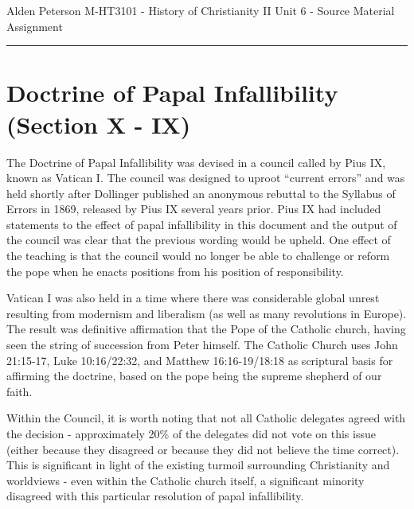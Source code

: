 \documentclass[12pt]{turabian-researchpaper}
\begin{document}
\begin{singlespace}
\noindent Alden Peterson \newline
\noindent M-HT3101 - History of Christianity II\newline
\noindent Unit 6 - Source Material Assignment
\newline\noindent\rule{4cm}{0.4pt}
\end{singlespace}




\section{Doctrine of Papal Infallibility (Section X - IX)}

The Doctrine of Papal Infallibility was devised in a council called by Pius IX, known as Vatican I.\autocite[pg.626]{woodbridge2013}  The council was designed to uproot “current errors” and was held shortly after Dollinger published an anonymous rebuttal to the Syllabus of Errors in 1869, released by Pius IX several years prior.\autocite[pg.626]{woodbridge2013}  Pius IX had included statements to the effect of papal infallibility in this document and the output of the council was clear that the previous wording would be upheld.\autocite[pg.626]{woodbridge2013}  One effect of the teaching is that the council would no longer be able to challenge or reform the pope when he enacts positions from his position of responsibility.\autocite[pg.626]{woodbridge2013} 

Vatican I was also held in a time where there was considerable global unrest resulting from modernism and liberalism (as well as many revolutions in Europe). The result was definitive affirmation that the Pope of the Catholic church, having seen the string of succession from Peter himself. The Catholic Church uses John 21:15-17, Luke 10:16/22:32, and Matthew 16:16-19/18:18 as scriptural basis for affirming the doctrine, based on the pope being the supreme shepherd of our faith.\autocite{papalinfallibility}

Within the Council, it is worth noting that not all Catholic delegates agreed with the decision - approximately 20\% of the delegates did not vote on this issue (either because they disagreed or because they did not believe the time correct).\autocite[pg.626]{woodbridge2013}  This is significant in light of the existing turmoil surrounding Christianity and worldviews - even within the Catholic church itself, a significant minority disagreed with this particular resolution of papal infallibility.


\newpage
\printbibliography
\end{document}
